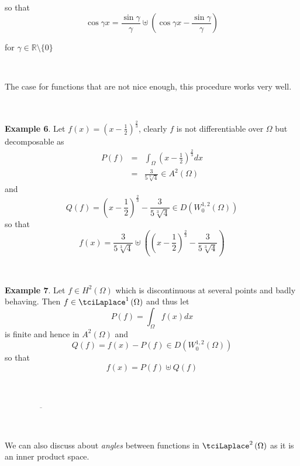 \documentclass{amsproc}
\theoremstyle{plain}
\numberwithin{equation}{section}
\begin{document}
\ 

so that 
\begin{equation*}
\cos \gamma x=\frac{\sin \gamma }{\gamma }\uplus \left( \cos \gamma x-\frac{\sin \gamma }{\gamma }\right)
\end{equation*}

for $\gamma \in 
\mathbb{R}
\setminus \{0\}$

\ \ 

The case for functions that are not nice enough, this procedure works very
well.

\ \ 

\textbf{Example 6}. Let $f(x)=\left( x-\frac{1}{2}\right) ^{\frac{2}{3}}$,
clearly $f$ is not differentiable over $\Omega $ but decomposable as\begin{eqnarray*}
P(f) &=&\int_{\Omega }\left( x-\frac{1}{2}\right) ^{\frac{2}{3}}dx \\
&=&\frac{3}{5\sqrt[3]{4}}\in A^{2}\left( \Omega \right)
\end{eqnarray*}and 
\begin{equation*}
Q(f)=\left( x-\frac{1}{2}\right) ^{\frac{2}{3}}-\frac{3}{5\sqrt[3]{4}}\in
D\left( W_{0}^{1,2}\left( \Omega \right) \right)
\end{equation*}so that 
\begin{equation*}
f(x)=\frac{3}{5\sqrt[3]{4}}\uplus \left( \left( x-\frac{1}{2}\right) ^{\frac{2}{3}}-\frac{3}{5\sqrt[3]{4}}\right)
\end{equation*}

\ \ 

\textbf{Example 7}. Let $f\in H^{2}(\Omega )$ which is discontinuous at
several points and badly behaving. Then $f\in \tciLaplace ^{1}\left( \Omega
\right) $ and thus let 
\begin{equation*}
P(f)=\int_{\Omega }f(x)dx
\end{equation*}is finite and hence in $A^{2}\left( \Omega \right) $ and 
\begin{equation*}
Q(f)=f(x)-P(f)\in D\left( W_{0}^{1,2}\left( \Omega \right) \right)
\end{equation*}so that\begin{equation*}
f(x)=P(f)\uplus Q(f)
\end{equation*}

\ \ \ \ \ \ 

$\overline{\ \ \ \ \ \ \ \ \ \ \ \ \ \ \ \ \ \ \ \ \ \ \ \ \ \ \ \ \ \ \ \ \
\ \ \ \ \ \ \ }$\ \ \ 

\ \ \ \ \ 

We can also discuss about \textit{angles} between functions in $\tciLaplace
^{2}\left( \Omega \right) $ as it is an inner product space.
\end{document}
